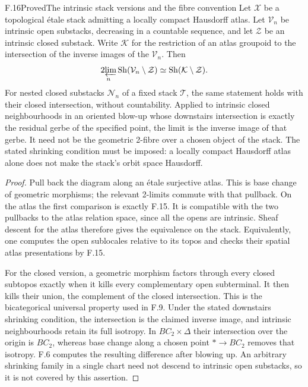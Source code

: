 \begin{statement}{F.16}{Proved}{The intrinsic stack versions and the fibre convention}
Let $\mathcal X$ be a topological \'etale stack admitting a locally
compact Hausdorff atlas. Let $\mathcal V_n$ be intrinsic open
substacks, decreasing in a countable sequence, and let
$\mathcal Z$ be an intrinsic closed substack. Write
$\mathcal K$ for the restriction of an atlas groupoid to the
intersection of the inverse images of the $\mathcal V_n$.
Then
\[
 \operatorname*{2\!\varprojlim}_n
       \operatorname{Sh}(\mathcal V_n\setminus\mathcal Z)
       \simeq\operatorname{Sh}(\mathcal K\setminus\mathcal Z).
\]
For nested closed substacks $\mathcal N_n$ of a fixed stack
$\mathcal T$, the same statement holds with their closed
intersection, without countability. Applied to intrinsic closed
neighbourhoods in an oriented blow-up whose downstairs intersection
is exactly the residual gerbe of the specified point, the limit is
the inverse image of that gerbe. It need not be the geometric
2-fibre over a chosen object of the stack. The stated shrinking
condition must be imposed: a locally compact Hausdorff atlas alone
does not make the stack's orbit space Hausdorff.
\end{statement}
\begin{proof}
Pull back the diagram along an \'etale surjective atlas. This is
base change of geometric morphisms; the relevant 2-limits commute
with that pullback. On the atlas the first comparison is exactly
F.15. It is compatible with the two pullbacks to the atlas relation
space, since all the opens are intrinsic. Sheaf descent for the
atlas therefore gives the equivalence on the stack. Equivalently,
one computes the open sublocales relative to its topos and checks
their spatial atlas presentations by F.15.

For the closed version, a geometric morphism factors through every
closed subtopos exactly when it kills every complementary open
subterminal. It then kills their union, the complement of the
closed intersection. This is the bicategorical universal property
used in F.9. Under the stated downstairs shrinking condition, the
intersection is the claimed inverse image, and intrinsic
neighbourhoods retain its full isotropy. In $BC_2\times\Delta$
their intersection over the origin
is $BC_2$, whereas base change along a chosen point $*\to BC_2$
removes that isotropy. F.6 computes the resulting difference after
blowing up. An arbitrary shrinking family in a single chart need
not descend to intrinsic open substacks, so it is not covered by
this assertion.
\end{proof}


